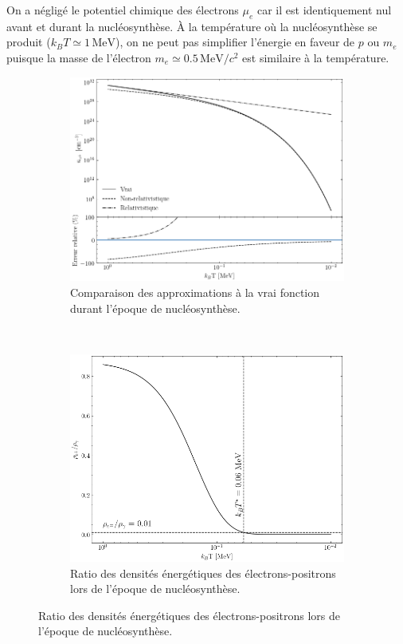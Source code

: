 \documentclass{article}
\numberwithin{equation}{section}
\begin{document}
On a négligé le potentiel chimique des électrons $\mu_e$ car il est 
identiquement nul avant et durant la nucléosynthèse.
À la 
température où la nucléosynthèse se produit ($k_BT \simeq 1\, \text{MeV}$), on ne 
peut pas simplifier l'énergie en faveur de $p$ ou $m_e$ puisque la masse de l'électron
$m_e \simeq 0.5\, \text{MeV}/c^2$ est similaire à la température. 
\begin{figure}[H]
        \centering
        \begin{subfigure}[t]{0.45\textwidth}
                \includegraphics[width=\textwidth]{nucleosynthesis_electron_density}
                \caption{Comparaison des approximations à la vrai fonction durant l'époque de 
                nucléosynthèse.}
                \label{fig:Comparaison}
        \end{subfigure}
        ~
        \begin{subfigure}[t]{0.45\textwidth}
                \includegraphics[width=\textwidth]{resultat_ratio_rho_ngamma}
                \caption{Ratio des densités énergétiques des électrons-positrons 
                lors de l'époque de nucléosynthèse.}
                \label{fig:Res1}
        \end{subfigure}
\end{figure}
\end{document}
